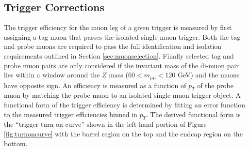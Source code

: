 \subsection{Trigger Corrections}
\label{subsec:triggercorrections}
The trigger efficiency for the muon leg of a given trigger is measured by first assigning a tag muon that passes the isolated single muon trigger. 
Both the tag and probe muons are required to pass the full identification and isolation requirements outlined in Section \ref{sec:muonselection}.
Finally selected tag and probe muon pairs are only considered if the invariant mass of the di-muon pair lies within a window around the $Z$ mass ($60 < m_{\mu\mu} < 120$ GeV) and the muons have opposite sign.
An efficiency is measured as a function of $p_{T}$ of the probe muon by matching the probe muon to an isolated single muon trigger object.
A functional form of the trigger efficiency is determined by fitting an error function to the measured trigger efficiencies binned in $p_{T}$.
The derived functional form is the ``trigger turn on curve'' shown in the left hand portion of Figure \ref{fig:turnoncurve} with the barrel region on the top and the endcap region on the bottom.
